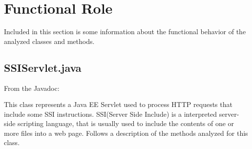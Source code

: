 \documentclass[11pt,titlepage]{article} %
\begin{document}
\newpage


\section{Functional Role}
  Included in this section is some information about the functional behavior of the analyzed classes and methods.\newline

\subsection{SSIServlet.java}

  From the Javadoc:

  

  \noindent This class represents a Java EE Servlet used to process HTTP requests that include some SSI instructions.\newline
  SSI(Server Side Include) is a interpreted server-side scripting language,
  that is usually used to include the contents of one or more files into a web page.\newline
  Follows a description of the methods analyzed for this class.
\end{document}
